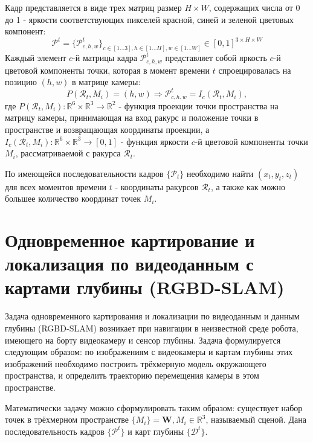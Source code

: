 \documentclass{mipt-thesis-ms}
\begin{document}
	Кадр представляется в виде трех матриц размер $H \times W$, содержащих числа от 0 до 1 - яркости соответствующих пикселей красной, синей и зеленой цветовых компонент:
	$$\mathcal{P}^t = \{\mathcal{P}^t_{c,h,w}\}_{c \in [1 \dots 3], h \in [1 \dots H], w \in [1 \dots W]} \in [0, 1]^{3 \times H \times W}$$
	Каждый элемент $c$-й матрицы кадра $\mathcal{P}^t_{c,h,w}$ представляет собой яркость $c$-й цветовой компоненты точки, которая в момент времени $t$ спроецировалась на позицию $(h, w)$ в матрице камеры:
	$$P(\mathcal{R}_t, M_i) = (h, w) \Rightarrow \mathcal{P}^t_{c,h,w} = I_c(\mathcal{R}_t, M_i),$$
	где $P(\mathcal{R}_t, M_i): \mathbb{R}^6 \times \mathbb{R}^3 \rightarrow \mathbb{R}^2$ - функция проекции точки пространства на матрицу камеры, принимающая на вход ракурс и положение точки в пространстве и возвращающая координаты проекции, а $I_c (\mathcal{R}_t, M_i): \mathbb{R}^6 \times \mathbb{R}^3 \rightarrow [0, 1]$ - функция яркости $c$-й цветовой компоненты точки $M_i$, рассматриваемой с ракурса $\mathcal{R}_t$.
	
	По имеющейся последовательности кадров $\{\mathcal{P}_t\}$ необходимо найти $(x_t, y_t, z_t)$ для всех моментов времени $t$ - координаты ракурсов $\mathcal{R}_t$, а также как можно большее количество координат точек $M_i$.
	
	\section{Одновременное картирование и локализация по видеоданным с картами глубины (RGBD-SLAM)}
	
	Задача одновременного картирования и локализации по видеоданным и данным глубины (RGBD-SLAM) возникает при навигации в неизвестной среде робота, имеющего на борту видеокамеру и сенсор глубины. Задача формулируется следующим образом: по изображениям с видеокамеры и картам глубины этих изображений необходимо построить трёхмерную модель окружающего пространства, и определить траекторию перемещения камеры в этом пространстве.
	
	Математически задачу можно сформулировать таким образом: существует набор точек в трёхмерном пространстве $\{M_i \} = \textbf{W}, M_i \in \mathbb{R}^3$, называемый сценой. Дана последовательность кадров $\{\mathcal{P}^t\}$ и карт глубины $\{\mathcal{D}^t\}$.
	
\end{document}
